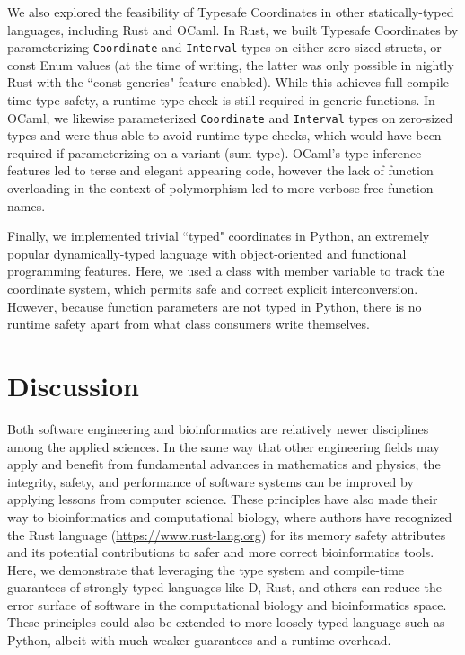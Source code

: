 \documentclass[12pt]{article}
\begin{document}
We also explored the feasibility of Typesafe Coordinates in other statically-typed languages, including Rust and OCaml. In Rust, we built Typesafe Coordinates by parameterizing \texttt{Coordinate} and \texttt{Interval} types on either zero-sized structs, or const Enum values (at the time of writing, the latter was only possible in nightly Rust with the ``const generics" feature enabled). While this achieves full compile-time type safety, a runtime type check is still required in generic functions. In OCaml, we likewise parameterized \texttt{Coordinate} and \texttt{Interval} types on zero-sized types and were thus able to avoid runtime type checks, which would have been required if parameterizing on a variant (sum type). OCaml's type inference features led to terse and elegant appearing code, however the lack of function overloading in the context of polymorphism led to more verbose free function names.

Finally, we implemented trivial ``typed" coordinates in Python, an extremely popular dynamically-typed language with object-oriented and functional programming features. Here, we used a class with member variable to track the coordinate system, which permits safe and correct explicit interconversion. However, because function parameters are not typed in Python, there is no runtime safety apart from what class consumers write themselves.

\section*{Discussion}   %

Both software engineering and bioinformatics are relatively newer disciplines among the applied sciences. In the same way that other engineering fields may apply and benefit from fundamental advances in mathematics and physics, the integrity, safety, and performance of software systems can be improved by applying lessons from computer science. These principles have also made their way to bioinformatics and computational biology, where authors have recognized the Rust language (\url{https://www.rust-lang.org}) for its memory safety attributes and its potential contributions to safer and more correct bioinformatics tools.\cite{koster_rust-bio_2016,perkel_why_2020}  Here, we demonstrate that leveraging the type system and compile-time guarantees of strongly typed languages like D, Rust, and others can reduce the error surface of software in the computational biology and bioinformatics space. These principles could also be extended to more loosely typed language such as Python, albeit with much weaker guarantees and a runtime overhead.
\end{document}
